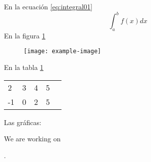 En la ecuación \eqref{eq:integral01}
\begin{equation}\label{eq:integral01}
 \int_a^bf(x)dx
\end{equation}
En la figura \ref{fig:prueba01}
\begin{figure}\label{fig:prueba01}
    \texttt{[image: example-image]}
\end{figure}
En la tabla \ref{tabla:matriz01}
\begin{table}[H]\label{tabla:matriz01}
    \begin{tabular}{lllll}
     2& 3 & 4 & 5 &  \\
     -1& 0 & 2 & 5 &  
    \end{tabular}
\end{table}
Las gráficas:

We are working on
.

